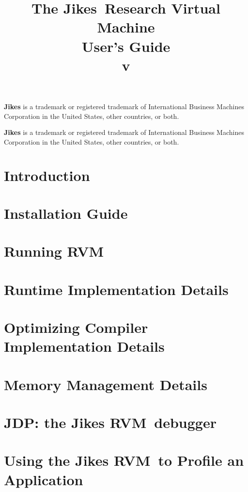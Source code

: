 \documentclass{article}
\title{\texonly{\vfill} {\huge The Jikes\JikesTMFootnote\ Research Virtual
Machine
\\
User's Guide} \\ {\huge v\version} \\ { } \texonly{\vfill} }
\newcommand{\JikesTMFooter}{\W \hline \small {\bf Jikes} is a
trademark or registered trademark of International Business Machines
Corporation in the United States, other countries, or both.}
\newcommand{\jrvm}{Jikes RVM}
\begin{document}
\maketitle
\date{}

\T \JikesTMFooter

\T \newpage
\label{hlxtoc}
\T \tableofcontents
\T \listoffigures
\W {}

\W \JikesTMFooter

\T \newpage
\section{Introduction}


\T \newpage
\section{Installation Guide} \label{section:installation}


\T \newpage
\section{Running RVM} \label{section:running}


\T \newpage
\section{Runtime Implementation Details}


\T \newpage
\section{Optimizing Compiler Implementation Details}
\label{section:optdetails}


\T \newpage
\section{Memory Management Details}


\T \newpage
\section{JDP: the \jrvm\ debugger}


\T \newpage
\section{Using the \jrvm\ to Profile an Application}

\end{document}
